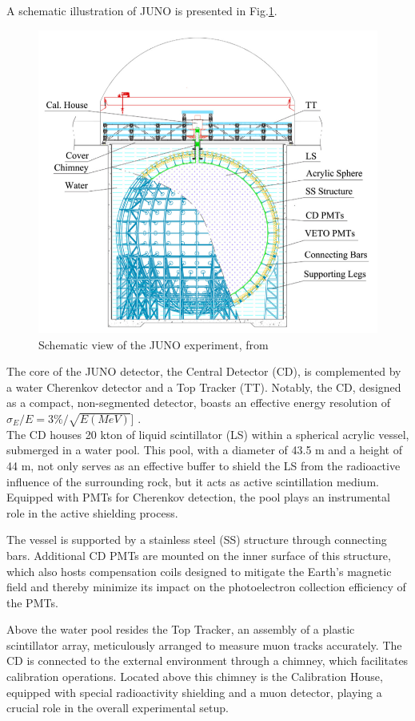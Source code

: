A schematic illustration of JUNO is presented in Fig.\ref{fig:junoschemeexperiment}.


\begin{figure}[h]
	\centering
	\includegraphics[width=0.6\linewidth]{Images/juno_scheme_experiment}
	\caption[JUNO scheme experiment]{Schematic view of the JUNO experiment, from \cite{JUNOdet}}
	\label{fig:junoschemeexperiment}
\end{figure}

The core of the JUNO detector, the Central Detector (CD), is complemented by a water Cherenkov detector and a Top Tracker (TT). Notably, the CD, designed as a compact, non-segmented detector, boasts an effective energy resolution of $\sigma_E/E =3\% / \sqrt{E (MeV)}$] \cite{JUNOdet}.\\

The CD houses 20 kton of liquid scintillator (LS) within a spherical acrylic vessel, submerged in a water pool. This pool, with a diameter of 43.5 m and a height of 44 m, not only serves as an effective buffer to shield the LS from the radioactive influence of the surrounding rock, but it acts as active scintillation medium. Equipped with PMTs for Cherenkov detection, the pool plays an instrumental role in the active shielding process.

The vessel is supported by a stainless steel (SS) structure through connecting bars. Additional CD PMTs are mounted on the inner surface of this structure, which also hosts compensation coils designed to mitigate the Earth's magnetic field and thereby minimize its impact on the photoelectron collection efficiency of the PMTs.

Above the water pool resides the Top Tracker, an assembly of a plastic scintillator array, meticulously arranged to measure muon tracks accurately. The CD is connected to the external environment through a chimney, which facilitates calibration operations. Located above this chimney is the Calibration House, equipped with special radioactivity shielding and a muon detector, playing a crucial role in the overall experimental setup.

